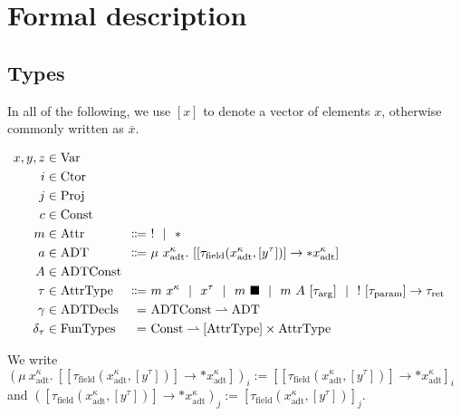 \chapter{Formal description}\label{sec:theory}

\newcommand{\sep}{\ \ |\ \ }
\newcommand{\icode}[1]{\textrm{\lstinline[language=ir-if]|#1|}}

\section{Types}
In all of the following, we use $[x]$ to denote a vector of elements $x$, otherwise commonly written as $\overline{x}$.

\newcommand{\Var}{\mathrm{Var}}
\newcommand{\Ctor}{\mathrm{Ctor}}
\newcommand{\Proj}{\mathrm{Proj}}
\newcommand{\Const}{\mathrm{Const}}
\newcommand{\Attr}{\mathrm{Attr}}
\newcommand{\ADT}{\mathrm{ADT}}
\newcommand{\adt}{\mathrm{adt}}
\newcommand{\field}{\mathrm{field}}
\newcommand{\ADTConst}{\mathrm{ADTConst}}
\newcommand{\AttrType}{\mathrm{AttrType}}
\newcommand{\arrg}{\mathrm{arg}}
\newcommand{\param}{\mathrm{param}}
\newcommand{\ret}{\mathrm{ret}}
\newcommand{\ADTDecls}{\mathrm{ADTDecls}}
\newcommand{\FunTypes}{\mathrm{FunTypes}}

\begin{alignat*}{2}
  x, y, z &\in \Var \\
  i &\in \Ctor \\
  j &\in \Proj \\
  c &\in \Const \\
  m &\in \Attr &\Coloneqq&\ ! \sep * \\
  a &\in \ADT &\Coloneqq&\ \mu\ x^\kappa_\adt.\ [[\tau_\field(x^\kappa_\adt, [y^\tau])] \to *x^\kappa_\adt] \\
  A &\in \mathrlap{\ADTConst} \\
  \tau &\in \AttrType &\Coloneqq&\ m\ x^\kappa \sep x^\tau \sep m\ \blacksquare \sep m\ A\ [\tau_\arrg] \sep !\ [\tau_\param] \to \tau_\ret \\
  \gamma &\in \ADTDecls &=&\ \ADTConst \rightharpoonup \ADT \\
  \delta_\tau &\in \FunTypes &=&\ \Const \rightharpoonup [\AttrType] \times \AttrType
\end{alignat*}

We write $(\mu\ x^\kappa_\adt.\ [[\tau_\field(x^\kappa_\adt, [y^\tau])] \to *x^\kappa_\adt])_i := [[\tau_\field(x^\kappa_\adt, [y^\tau])] \to *x^\kappa_\adt]_i$ and $([\tau_\field(x^\kappa_\adt, [y^\tau])] \to *x^\kappa_\adt)_j := [\tau_\field(x^\kappa_\adt, [y^\tau])]_j$.

